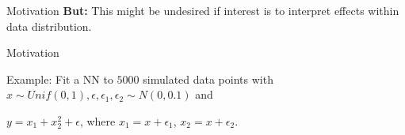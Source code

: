 \documentclass[11pt,compress,t,notes=noshow, aspectratio=169, xcolor=table]{beamer}
\begin{document}
\begin{frame}{Motivation}
\textbf{But:} This might be undesired if interest is to interpret effects within data distribution.



\end{frame}


\begin{frame}{Motivation}


Example: Fit a NN to $5000$ simulated data points with $x \sim Unif(0,1), \epsilon, \epsilon_1, \epsilon_2 \sim N(0, 0.1)$ and

\centerline{$y = x_1 + x_2^2 + \epsilon$, where
$x_1 = x + \epsilon_1$, 
$x_2 = x + \epsilon_2$.}

\begin{columns}[T]
\begin{column}{0.65\textwidth}
\centering
{}
\end{column}
\begin{column}{0.35\textwidth}


\end{column}
\end{columns}
\end{frame}
\end{document}
